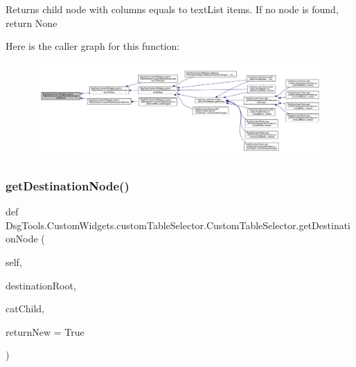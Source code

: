 \begin{DoxyVerb}Returns child node with columns equals to textList items. If no node is found, return None
\end{DoxyVerb}
 Here is the caller graph for this function\+:
\nopagebreak
\begin{figure}[H]
\begin{center}
\leavevmode
\includegraphics[width=350pt]{class_dsg_tools_1_1_custom_widgets_1_1custom_table_selector_1_1_custom_table_selector_a3bc4894af63d0aac442960b7647bafb8_icgraph}
\end{center}
\end{figure}
\mbox{\label{class_dsg_tools_1_1_custom_widgets_1_1custom_table_selector_1_1_custom_table_selector_a5068e2812f9a69da059f578283dabfe9}} 
\subsubsection{\texorpdfstring{get\+Destination\+Node()}{getDestinationNode()}}
{\footnotesize\ttfamily def Dsg\+Tools.\+Custom\+Widgets.\+custom\+Table\+Selector.\+Custom\+Table\+Selector.\+get\+Destination\+Node (\begin{DoxyParamCaption}\item[{}]{self,  }\item[{}]{destination\+Root,  }\item[{}]{cat\+Child,  }\item[{}]{return\+New = {\ttfamily True} }\end{DoxyParamCaption})}


